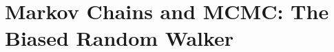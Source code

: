 \chapter{Markov Chains and MCMC: The Biased Random Walker}\label{ch:09}
\providecommand{\NineAOscN}{}\renewcommand{\NineAOscN}{50\,000}
\providecommand{\NineAOscChi}{}\renewcommand{\NineAOscChi}{75.9}
\providecommand{\NineAOscBins}{}\renewcommand{\NineAOscBins}{80}
\providecommand{\NineAOscMeanSq}{}\renewcommand{\NineAOscMeanSq}{0.501}
\providecommand{\NineATwoMeanTime}{}\renewcommand{\NineATwoMeanTime}{0.489}
\providecommand{\NineATwoSqTime}{}\renewcommand{\NineATwoSqTime}{0.357}
\providecommand{\NineATwoLowTime}{}\renewcommand{\NineATwoLowTime}{0.205}
\providecommand{\NineATwoMeanEns}{}\renewcommand{\NineATwoMeanEns}{0.489}
\providecommand{\NineATwoSqEns}{}\renewcommand{\NineATwoSqEns}{0.318}
\providecommand{\NineATwoLowEns}{}\renewcommand{\NineATwoLowEns}{0.102}
\providecommand{\NineATwoKappa}{}\renewcommand{\NineATwoKappa}{0.05}
\providecommand{\NineAIslTwoThree}{}\renewcommand{\NineAIslTwoThree}{0.375}
\providecommand{\NineAIslTwoFour}{}\renewcommand{\NineAIslTwoFour}{0.125}
\providecommand{\NineAIslTwoFive}{}\renewcommand{\NineAIslTwoFive}{0.5}
\providecommand{\NineAIslThreeTwo}{}\renewcommand{\NineAIslThreeTwo}{0.125}
\providecommand{\NineAIslThreeThree}{}\renewcommand{\NineAIslThreeThree}{0.1094}
\providecommand{\NineAIslThreeFour}{}\renewcommand{\NineAIslThreeFour}{0.4031}
\providecommand{\NineAIslThreeFive}{}\renewcommand{\NineAIslThreeFive}{0.1125}
\providecommand{\NineAIslThreeSix}{}\renewcommand{\NineAIslThreeSix}{0.25}
\providecommand{\NineAIslTVThirteen}{}\renewcommand{\NineAIslTVThirteen}{0.048}
\providecommand{\NineAIslTVNinetyNine}{}\renewcommand{\NineAIslTVNinetyNine}{1.5\times10^{-6}}
\providecommand{\NineAIslMaxDev}{}\renewcommand{\NineAIslMaxDev}{0.0025}
\providecommand{\NineAIslDays}{}\renewcommand{\NineAIslDays}{100\,000}
\providecommand{\NineAIslWalkers}{}\renewcommand{\NineAIslWalkers}{20\,000}
\providecommand{\NineAIslLamTwo}{}\renewcommand{\NineAIslLamTwo}{0.887}
\providecommand{\NineAWLamTwo}{}\renewcommand{\NineAWLamTwo}{0.6}
\providecommand{\NineAWLamThree}{}\renewcommand{\NineAWLamThree}{0.1}
\providecommand{\NineAWSlope}{}\renewcommand{\NineAWSlope}{-0.5108}
\providecommand{\NineAWLnLam}{}\renewcommand{\NineAWLnLam}{-0.5108}
\providecommand{\NineAWDelta}{}\renewcommand{\NineAWDelta}{0.3}
\providecommand{\NineAWTVTen}{}\renewcommand{\NineAWTVTen}{0.0036}
\providecommand{\NineAWTVTenPred}{}\renewcommand{\NineAWTVTenPred}{0.0036}
\providecommand{\NineAWTVTwenty}{}\renewcommand{\NineAWTVTwenty}{2.19\times10^{-5}}
